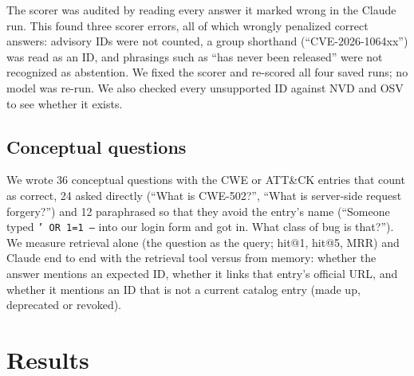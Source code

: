 \documentclass[final]{cvpr}
\begin{document}
The scorer was audited by reading every answer it marked wrong in the Claude run. This found three scorer errors, all of which wrongly penalized correct answers: advisory IDs were not counted, a group shorthand (``CVE-2026-1064xx'') was read as an ID, and phrasings such as ``has never been released'' were not recognized as abstention. We fixed the scorer and re-scored all four saved runs; no model was re-run. We also checked every unsupported ID against NVD and OSV to see whether it exists.

\subsection{Conceptual questions}
We wrote 36 conceptual questions with the CWE or ATT\&CK entries that count as correct, 24 asked directly (``What is CWE-502?'', ``What is server-side request forgery?'') and 12 paraphrased so that they avoid the entry's name (``Someone typed \texttt{' OR 1=1 --} into our login form and got in. What class of bug is that?''). We measure retrieval alone (the question as the query; hit@1, hit@5, MRR) and Claude end to end with the retrieval tool versus from memory: whether the answer mentions an expected ID, whether it links that entry's official URL, and whether it mentions an ID that is not a current catalog entry (made up, deprecated or revoked).

\section{Results}
\label{sec:results}
\end{document}

